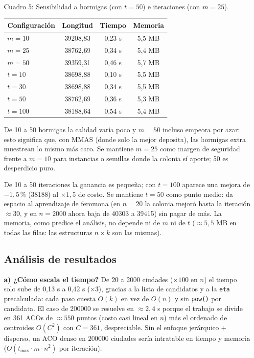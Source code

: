 \documentclass[12pt,a4paper]{article}
\begin{document}
Cuadro 5: Sensibilidad a hormigas (con $t = 50$) e iteraciones (con $m = 25$).
\begin{center}
\begin{tabular}{lccc}
\toprule
Configuración & Longitud & Tiempo & Memoria \\
\midrule
$m = 10$ & 39208,83 & 0,23 s & 5,5 MB \\
$m = 25$ & 38762,69 & 0,34 s & 5,4 MB \\
$m = 50$ & 39359,31 & 0,46 s & 5,7 MB \\
\midrule
$t = 10$ & 38698,88 & 0,10 s & 5,5 MB \\
$t = 30$ & 38698,88 & 0,34 s & 5,5 MB \\
$t = 50$ & 38762,69 & 0,36 s & 5,3 MB \\
$t = 100$ & 38188,64 & 0,54 s & 5,4 MB \\
\bottomrule
\end{tabular}
\end{center}

De 10 a 50 hormigas la calidad varía poco y $m = 50$ incluso empeora por azar:
esto significa que, con MMAS (donde solo la mejor deposita), las hormigas
extra muestrean lo mismo más caro. Se mantiene $m = 25$ como margen de
seguridad frente a $m = 10$ para instancias o semillas donde la colonia sí
aporte; 50 es desperdicio puro.

De 10 a 50 iteraciones la ganancia es pequeña; con $t = 100$ aparece una
mejora de $-1,5$\,\% (38188) al $\times 1,5$ de costo. Se mantiene $t = 50$
como punto medio: da espacio al aprendizaje de feromona (en $n = 20$ la
colonia mejoró hasta la iteración $\approx 30$, y en $n = 2000$ ahora baja de
40303 a 39415) sin pagar de más. La memoria, como predice el análisis, no
depende ni de $m$ ni de $t$ ($\approx 5,5$ MB en todas las filas: las
estructuras $n \times k$ son las mismas).

\subsection{Análisis de resultados}

\textbf{a) ¿Cómo escala el tiempo?}
De 20 a 2000 ciudades ($\times 100$ en $n$) el tiempo solo sube de 0,13 s a
0,42 s ($\times 3$), gracias a la lista de candidatos y a la \texttt{eta}
precalculada: cada paso cuesta $O(k)$ en vez de $O(n)$ y sin \texttt{pow()} por
candidata. El caso de 200000 se resuelve en $\approx 2,4$ s porque el
trabajo se divide en 361 ACOs de $\approx 550$ puntos (costo casi lineal en
$n$) más el ordenado de centroides $O(C^2)$ con $C = 361$, despreciable. Sin el
enfoque jerárquico + disperso, un ACO denso en 200000 ciudades sería intratable
en tiempo y memoria ($O(t_{\max} \cdot m \cdot n^2)$ por iteración).
\end{document}
